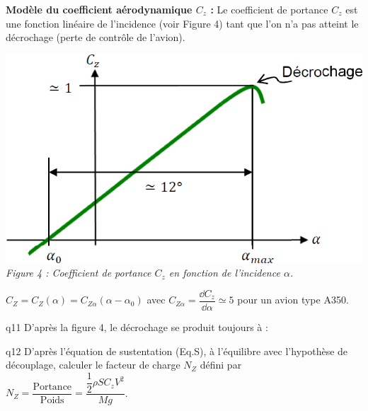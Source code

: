 \begin{multicols}{2}
\textbf{Modèle du coefficient aérodynamique $C_z$ :}
Le coefficient de portance $C_z$ est une fonction linéaire de l’incidence (voir Figure 4) tant que l’on n’a pas atteint le décrochage (perte de contrôle de l’avion).

\begin{center}
\includegraphics[width=\linewidth]{images/fig_04}
\textit{Figure 4 : Coefficient de portance $C_z$ en fonction de l'incidence $\alpha$.}
\end{center}

$C_Z=C_Z(\alpha)=C_{Z\alpha}\left(\alpha-\alpha_0\right)$ avec $C_{Z\alpha}= \dfrac{\dd C_z}{\dd \alpha}\simeq 5$ pour un avion type A350.



{\begin{question}{q11}
D’après la figure 4, le décrochage se produit toujours à :
\ifprof
\begin{corrige}
\end{corrige}
\else
\fi
\begin{reponses}
\end{reponses} \end{question}}
  
  
  
  
{\begin{question}{q12}
D’après l’équation de sustentation (Eq.S), à l’équilibre avec l’hypothèse de découplage,
calculer le facteur de charge $N_Z$ défini par $N_Z=\dfrac{\text{Portance}}{\text{Poids}}=\dfrac{\dfrac{1}{2}\rho SC_z V^2}{Mg}$.
\ifprof
\begin{corrige}
\end{corrige}
\else
\fi
\begin{reponses}
\end{reponses} \end{question}}
  

\end{multicols}

